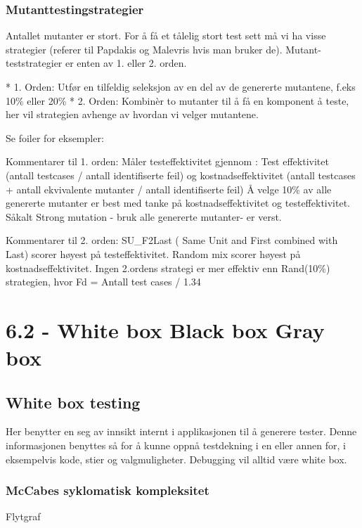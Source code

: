 \subsubsection{Mutanttestingstrategier}

Antallet mutanter er stort. For å få et tålelig stort test sett må vi ha
visse strategier (referer til Papdakis og Malevris hvis man bruker de).
Mutant-teststrategier er enten av 1. eller 2. orden.

* 1. Orden: Utfør en tilfeldig seleksjon av en del av de genererte
mutantene, f.eks 10\% eller 20\% * 2. Orden: Kombinèr to mutanter til å
få en komponent å teste, her vil strategien avhenge av hvordan vi velger
mutantene.

Se foiler for eksempler:

Kommentarer til 1. orden: Måler testeffektivitet gjennom : Test
effektivitet (antall testcases / antall identifiserte feil) og
kostnadseffektivitet (antall testcases + antall ekvivalente mutanter /
antall identifiserte feil) Å velge 10\% av alle genererte mutanter er
best med tanke på kostnadseffektivitet og testeffektivitet. Såkalt
Strong mutation - bruk alle genererte mutanter- er verst.

Kommentarer til 2. orden: SU\_F2Last ( Same Unit and First combined with
Last) scorer høyest på testeffektivitet. Random mix scorer høyest på
kostnadseffektivitet. Ingen 2.ordens strategi er mer effektiv enn
Rand(10\%) strategien, hvor Fd = Antall test cases / 1.34

\section{6.2 - White box Black box Gray box}

\subsection{White box testing}

Her benytter en seg av innsikt internt i applikasjonen til å generere
tester. Denne informasjonen benyttes så for å kunne oppnå testdekning i
en eller annen for, i eksempelvis kode, stier og valgmuligheter.
Debugging vil alltid være white box.

\subsubsection{McCabes syklomatisk kompleksitet}

Flytgraf

